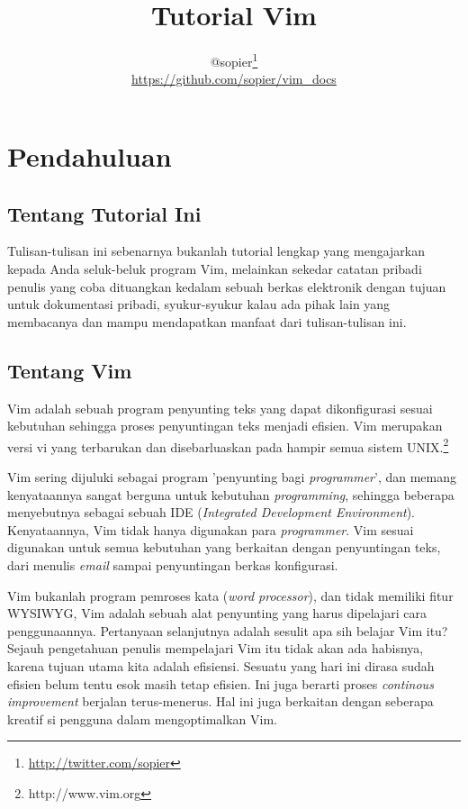 \documentclass{article}
\author{
  @sopier\footnote{\url{http://twitter.com/sopier}}\\
  \footnotesize{\url{https://github.com/sopier/vim\_docs}}
}
\title{Tutorial Vim}
\date{}
\begin{document}
\maketitle
\tableofcontents
\pagebreak

\section{Pendahuluan}
\subsection{Tentang Tutorial Ini}
Tulisan-tulisan ini sebenarnya bukanlah tutorial lengkap
yang mengajarkan kepada Anda seluk-beluk program Vim,
melainkan sekedar catatan pribadi penulis yang coba
dituangkan kedalam sebuah berkas elektronik dengan tujuan
untuk dokumentasi pribadi, syukur-syukur kalau ada pihak
lain yang membacanya dan mampu mendapatkan manfaat dari
tulisan-tulisan ini.

\subsection{Tentang Vim}
Vim adalah sebuah program penyunting teks yang dapat
dikonfigurasi sesuai kebutuhan sehingga proses penyuntingan
teks menjadi efisien. Vim merupakan versi vi yang
terbarukan dan disebarluaskan pada hampir semua sistem
UNIX.\footnote{http://www.vim.org}

Vim sering dijuluki sebagai program 'penyunting bagi
\emph{programmer}', dan memang kenyataannya sangat berguna
untuk kebutuhan \emph{programming}, sehingga beberapa
menyebutnya sebagai sebuah IDE (\emph{Integrated Development
Environment}). Kenyataannya, Vim tidak hanya digunakan para
\emph{programmer}. Vim sesuai digunakan untuk semua
kebutuhan yang berkaitan dengan penyuntingan teks, dari
menulis \emph{email} sampai penyuntingan berkas konfigurasi.

Vim bukanlah program pemroses kata (\emph{word processor}),
dan tidak memiliki fitur WYSIWYG, Vim adalah sebuah alat
penyunting yang harus dipelajari cara penggunaannya.
Pertanyaan selanjutnya adalah sesulit apa sih belajar Vim
itu? Sejauh pengetahuan penulis mempelajari Vim itu tidak
akan ada habisnya, karena tujuan utama kita adalah efisiensi.
Sesuatu yang hari ini dirasa sudah efisien belum tentu esok
masih tetap efisien. Ini juga berarti proses \emph{continous
improvement} berjalan terus-menerus. Hal ini juga berkaitan
dengan seberapa kreatif si pengguna dalam mengoptimalkan
Vim.
\end{document}
